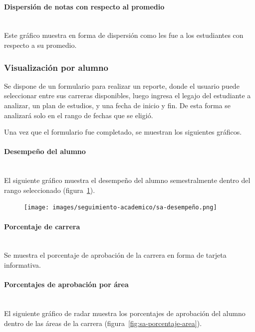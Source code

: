\paragraph{Dispersión de notas con respecto al promedio} \mbox{}\\
Este gráfico muestra en forma de dispersión como les fue a los estudiantes con respecto a su promedio.

\subsubsection{Visualización por alumno}
Se dispone de un formulario para realizar un reporte, donde el usuario puede seleccionar entre sus carreras disponibles, luego ingresa el legajo del estudiante a analizar, un plan de estudios, y una fecha de inicio y fin. De esta forma se analizará solo en el rango de fechas que se eligió.

Una vez que el formulario fue completado, se muestran los siguientes gráficos.

\paragraph{Desempeño del alumno} \mbox{}\\
El siguiente gráfico muestra el desempeño del alumno semestralmente dentro del rango seleccionado  (figura~\ref{fig:sa-detalle-aprobacion}).
\begin{figure}[H]
  \centering
    \texttt{[image: images/seguimiento-academico/sa-desempeño.png]}
  \label{fig:sa-detalle-aprobacion}
\end{figure}

\paragraph{Porcentaje de carrera} \mbox{}\\
Se muestra el porcentaje de aprobación de la carrera en forma de tarjeta informativa.

\paragraph{Porcentajes de aprobación por área} \mbox{}\\
El siguiente gráfico de radar muestra los porcentajes de aprobación del alumno dentro de las áreas de la carrera (figura~\ref{fig:sa-porcentaje-area}).

